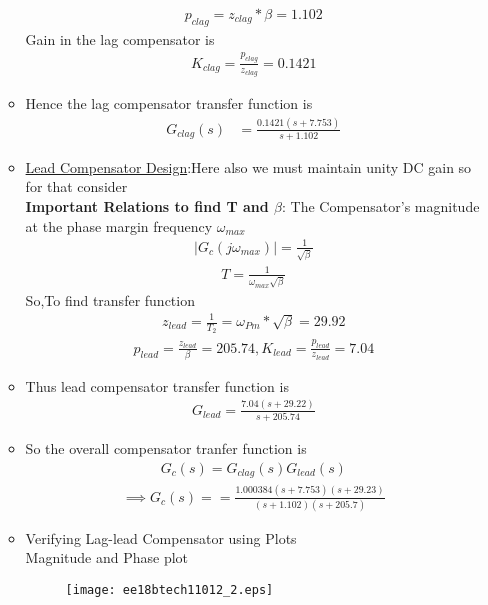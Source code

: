 \begin{enumerate}[label=\thesubsection.\arabic*.,ref=\thesubsection.\theenumi]
\begin{itemize}
\begin{align}
    p_{clag}=z_{clag}*\beta=1.102
\end{align}
Gain in the lag compensator is 
\begin{align}
    K_{clag} = \frac{p_{clag}}{z_{clag}}=0.1421
\end{align}
\item Hence the lag compensator transfer function is
\begin{align}
 G_{clag}(s) &= \frac{0.1421(s+7.753)}{s+1.102} 
\end{align}
\item \underline{Lead Compensator Design}:Here also we must maintain unity DC gain so for that consider\\
\textbf{Important Relations to find T and $\beta$}:
The Compensator's magnitude at the phase margin frequency $\omega_{max}$
\begin{align}
     |G_{c}(j\omega_{max})| = \frac{1}{\sqrt{\beta}} 
\end{align}
\begin{align}
    T = \frac{1}{\omega_{max}\sqrt{\beta}}
\end{align}
So,To find transfer function
\begin{align}
    z_{lead}=\frac{1}{T_{2}}=\omega_{Pm}*\sqrt{\beta}=29.92
\end{align}
\begin{align}
    p_{lead}=\frac{z_{lead}}{\beta}=205.74,K_{lead}=\frac{p_{lead}}{z_{lead}}=7.04
\end{align}
\item Thus lead compensator transfer function is 
\begin{align}
    G_{lead}= \frac{7.04(s+29.22)}{s+205.74} 
\end{align}
\item So the overall compensator tranfer function is
\begin{align}
    G_{c}(s) = G_{clag}(s)G_{lead}(s)
\end{align}
\begin{align}
\implies G_{c}(s)==\frac{1.000384(s+7.753)(s+29.23)}{(s+1.102)(s+205.7)}
\end{align}

\end{itemize}
\begin{itemize}
 
\item Verifying Lag-lead Compensator using Plots
\\
\solution 
Magnitude and Phase plot
\begin{figure}[!h]
\centering
  \texttt{[image: ee18btech11012\_2.eps]}
\caption{}
\label{fig:ee18btech11012_a} 
\end{figure}



\end{itemize}
\end{enumerate}
